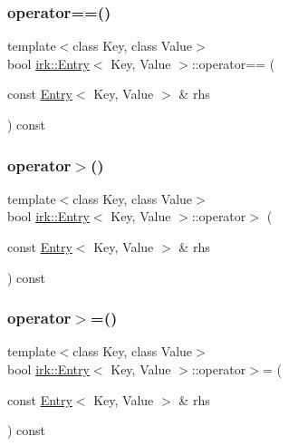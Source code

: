 \mbox{\label{structirk_1_1Entry_af34b12a16d6282739e7172d4f1311ba7}} 
\subsubsection{\texorpdfstring{operator==()}{operator==()}}
{\footnotesize\ttfamily template$<$class Key, class Value$>$ \\
bool \mbox{\hyperlink{structirk_1_1Entry}{irk\+::\+Entry}}$<$ Key, Value $>$\+::operator== (\begin{DoxyParamCaption}\item[{const \mbox{\hyperlink{structirk_1_1Entry}{Entry}}$<$ Key, Value $>$ \&}]{rhs }\end{DoxyParamCaption}) const\hspace{0.3cm}{\ttfamily [inline]}}

\mbox{\label{structirk_1_1Entry_a629565fa309239a70fbc9a0eac5a19a8}} 
\subsubsection{\texorpdfstring{operator$>$()}{operator>()}}
{\footnotesize\ttfamily template$<$class Key, class Value$>$ \\
bool \mbox{\hyperlink{structirk_1_1Entry}{irk\+::\+Entry}}$<$ Key, Value $>$\+::operator$>$ (\begin{DoxyParamCaption}\item[{const \mbox{\hyperlink{structirk_1_1Entry}{Entry}}$<$ Key, Value $>$ \&}]{rhs }\end{DoxyParamCaption}) const\hspace{0.3cm}{\ttfamily [inline]}}

\mbox{\label{structirk_1_1Entry_ac39aa16af8eb24507233d2f508ca95f3}} 
\subsubsection{\texorpdfstring{operator$>$=()}{operator>=()}}
{\footnotesize\ttfamily template$<$class Key, class Value$>$ \\
bool \mbox{\hyperlink{structirk_1_1Entry}{irk\+::\+Entry}}$<$ Key, Value $>$\+::operator$>$= (\begin{DoxyParamCaption}\item[{const \mbox{\hyperlink{structirk_1_1Entry}{Entry}}$<$ Key, Value $>$ \&}]{rhs }\end{DoxyParamCaption}) const\hspace{0.3cm}{\ttfamily [inline]}}



